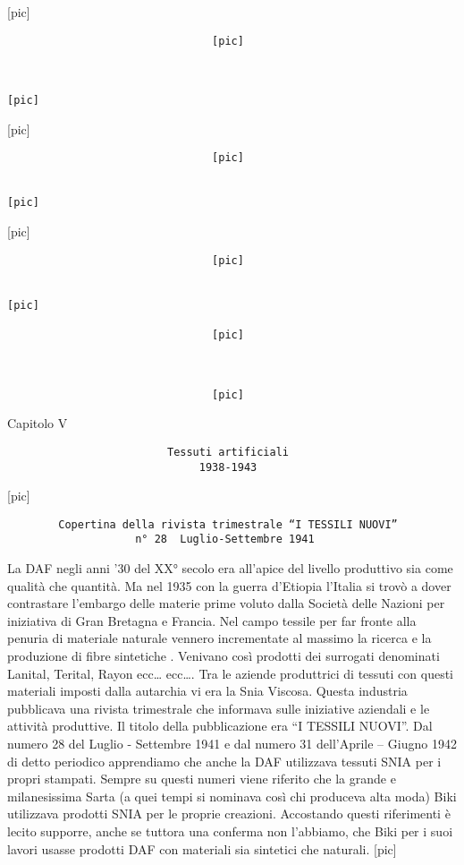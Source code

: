 {[}pic{]}

\begin{verbatim}
                                [pic]


                                                                   [pic]
\end{verbatim}

{[}pic{]}

\begin{verbatim}
                                [pic]

                                                                   [pic]
\end{verbatim}

{[}pic{]}

\begin{verbatim}
                                [pic]

                                                                   [pic]

                                [pic]



                                [pic]
\end{verbatim}

Capitolo V

\begin{verbatim}
                         Tessuti artificiali
                              1938-1943
\end{verbatim}

{[}pic{]}

\begin{verbatim}
        Copertina della rivista trimestrale “I TESSILI NUOVI”
                    n° 28  Luglio-Settembre 1941
\end{verbatim}

La DAF negli anni '30 del XX° secolo era all'apice del livello
produttivo sia come qualità che quantità. Ma nel 1935 con la guerra
d'Etiopia l'Italia si trovò a dover contrastare l'embargo delle materie
prime voluto dalla Società delle Nazioni per iniziativa di Gran Bretagna
e Francia. Nel campo tessile per far fronte alla penuria di materiale
naturale vennero incrementate al massimo la ricerca e la produzione di
fibre sintetiche . Venivano così prodotti dei surrogati denominati
Lanital, Terital, Rayon ecc\ldots{} ecc\ldots{}. Tra le aziende
produttrici di tessuti con questi materiali imposti dalla autarchia vi
era la Snia Viscosa. Questa industria pubblicava una rivista trimestrale
che informava sulle iniziative aziendali e le attività produttive. Il
titolo della pubblicazione era ``I TESSILI NUOVI''. Dal numero 28 del
Luglio - Settembre 1941 e dal numero 31 dell'Aprile -- Giugno 1942 di
detto periodico apprendiamo che anche la DAF utilizzava tessuti SNIA per
i propri stampati. Sempre su questi numeri viene riferito che la grande
e milanesissima Sarta (a quei tempi si nominava così chi produceva alta
moda) Biki utilizzava prodotti SNIA per le proprie creazioni. Accostando
questi riferimenti è lecito supporre, anche se tuttora una conferma non
l'abbiamo, che Biki per i suoi lavori usasse prodotti DAF con materiali
sia sintetici che naturali. {[}pic{]}

